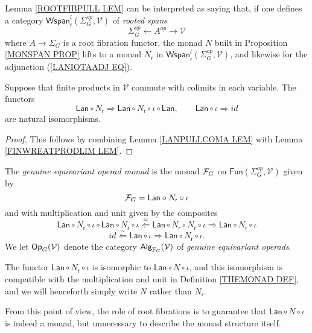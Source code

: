 \documentclass[a4paper,10pt]{article}%
\begin{document}
Lemma \ref{ROOTFIBPULL LEM} can be interpreted as saying that, if one defines a category
$\mathsf{Wspan}^l_{\mathsf{r}}(\Sigma_G^{op},\mathcal{V})$
of \textit{rooted spans}
\[
\Sigma_G^{op} \leftarrow A^{op} \to \mathcal{V}
\]
where $A \to \Sigma_G$ is a root fibration functor, the monad $N$ built in Proposition \ref{MONSPAN PROP} lifts to a monad 
$N_{\mathsf{r}}$ in
$\mathsf{Wspan}^l_{\mathsf{r}}(\Sigma_G^{op},\mathcal{V})$,
and likewise for the adjunction (\ref{LANIOTAADJ EQ}).

\begin{corollary}
Suppose that finite products in $\mathcal{V}$ commute with colimits in each variable.
The functors
\[
	\mathsf{Lan} \circ N_{\mathsf{r}} \Rightarrow
	\mathsf{Lan} \circ N_{\mathsf{r}} \circ \iota \circ \mathsf{Lan},
\qquad
	\mathsf{Lan} \circ \iota \Rightarrow id
\]
are natural isomorphisms.
\end{corollary}

\begin{proof}
This follows by combining Lemma \ref{LANPULLCOMA LEM} with Lemma \ref{FINWREATPRODLIM LEM}.
\end{proof}


\begin{definition}\label{THEMONAD DEF}
The \textit{genuine equivariant operad monad} is the monad
$\mathcal F_G$ on $\mathsf{Fun}(\Sigma_G^{op}, \mathcal{V})$
given by
\[
	\mathcal F_G = \mathsf{Lan} \circ N_{\mathsf{r}} \circ \iota
\]
and with multiplication and unit given by the composites
\[
\mathsf{Lan} \circ N_{\mathsf{r}} \circ \iota \circ
\mathsf{Lan} \circ N_{\mathsf{r}} \circ \iota
\overset{\simeq}{\Leftarrow}
\mathsf{Lan} \circ N_{\mathsf{r}} \circ  N_{\mathsf{r}} \circ \iota
\Rightarrow
\mathsf{Lan} \circ N_{\mathsf{r}} \circ \iota
\]
\[
id \overset{\simeq}{\Leftarrow} \mathsf{Lan} \circ \iota
\Rightarrow
\mathsf{Lan} \circ N_{\mathsf{r}} \circ \iota.
\]
We let $\mathsf{Op}_G(\mathcal V)$ denote the category $\mathsf{Alg}_{\mathbb F_G}(\mathcal V)$ of \textit{genuine equivariant operads}.
\end{definition}


\begin{remark}
	The functor $\mathsf{Lan} \circ N_{\mathsf{r}} \circ \iota$ is isomorphic to 
	$\mathsf{Lan} \circ N \circ \iota$, and this isomorphism is compatible with the multiplication and unit	in Definition \ref{THEMONAD DEF}, and we will henceforth simply write $N$ rather than $N_{\mathsf{r}}$.
	
	From this point of view, the role of root fibrations is to guarantee that $\mathsf{Lan} \circ N \circ \iota$ is indeed a monad, but unnecessary to describe the monad structure itself.
\end{remark}
\end{document}
